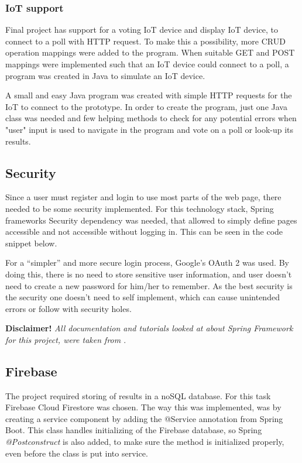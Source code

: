 \subsubsection{IoT support}\label{subsub:IoTsupport}
Final project has support for a voting IoT device and display IoT device, to connect to a poll with HTTP request. To make this a possibility, more CRUD operation mappings were added to the program. When suitable GET and POST mappings were implemented such that an IoT device could connect to a poll, a program was created in Java to simulate an IoT device.

A small and easy Java program was created with simple HTTP requests for the IoT to connect to the prototype. In order to create the program, just one Java class was needed and few helping methods to check for any potential errors when "user" input is used to navigate in the program and vote on a poll or look-up its results.

\subsection{Security}\label{sub:security}
Since a user must register and login to use most parts of the web page, there needed to be some security implemented. For this technology stack, Spring frameworks Security dependency was needed, that allowed to simply define pages accessible and not accessible without logging in. This can be seen in the code snippet below.

For a “simpler” and more secure login process, Google's OAuth 2 was used. By doing this, there is no need to store sensitive user information, and user doesn't need to create a new password for him/her to remember. As the best security is the security one doesn't need to self implement, which can cause unintended errors or follow with security holes.\vspace{\baselineskip}


{\footnotesize\textbf{Disclaimer!}\textit{ All documentation and tutorials looked at about Spring Framework for this project, were taken from \cite{spring_Framework}}.}

\subsection{Firebase}\label{sub:firebaseimplement}
The project required storing of results in a noSQL database. For this task Firebase Cloud Firestore was chosen. The way this was implemented, was by creating a service component by adding the @Service annotation from Spring Boot. This class handles initializing of the Firebase database, so Spring \textit{@Postconstruct} is also added, to make sure the method is initialized properly, even before the class is put into service.

